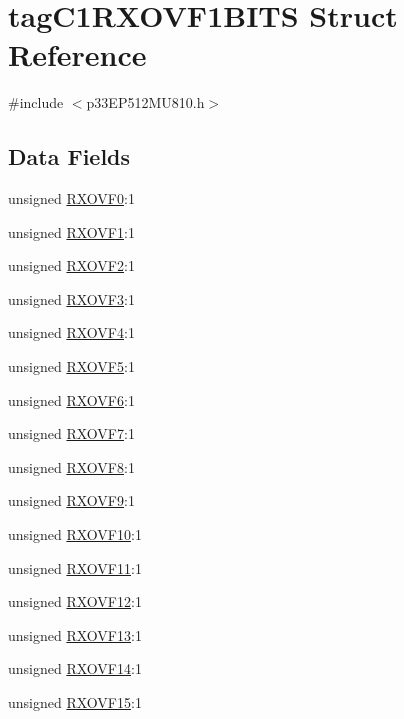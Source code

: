 \hypertarget{structtag_c1_r_x_o_v_f1_b_i_t_s}{}\section{tag\+C1\+R\+X\+O\+V\+F1\+B\+I\+TS Struct Reference}
\label{structtag_c1_r_x_o_v_f1_b_i_t_s}


{\ttfamily \#include $<$p33\+E\+P512\+M\+U810.\+h$>$}

\subsection*{Data Fields}
\begin{DoxyCompactItemize}
\item 
unsigned \hyperlink{structtag_c1_r_x_o_v_f1_b_i_t_s_ae0b847b473348ca5a45c6f38ee08bbcb}{R\+X\+O\+V\+F0}\+:1
\item 
unsigned \hyperlink{structtag_c1_r_x_o_v_f1_b_i_t_s_a891cc3298219da79ad3587b2af0ce757}{R\+X\+O\+V\+F1}\+:1
\item 
unsigned \hyperlink{structtag_c1_r_x_o_v_f1_b_i_t_s_a191326a306fedb6166b6cdc603942680}{R\+X\+O\+V\+F2}\+:1
\item 
unsigned \hyperlink{structtag_c1_r_x_o_v_f1_b_i_t_s_a1eec8dfb9c616fce24f842eb366bc147}{R\+X\+O\+V\+F3}\+:1
\item 
unsigned \hyperlink{structtag_c1_r_x_o_v_f1_b_i_t_s_a2831c78a3982628ca3784c2dca25df43}{R\+X\+O\+V\+F4}\+:1
\item 
unsigned \hyperlink{structtag_c1_r_x_o_v_f1_b_i_t_s_aed0050151e4d5c22e7028b5c12444c8a}{R\+X\+O\+V\+F5}\+:1
\item 
unsigned \hyperlink{structtag_c1_r_x_o_v_f1_b_i_t_s_a6ccb1f1e3c9cd54c2969afb6930a4ac8}{R\+X\+O\+V\+F6}\+:1
\item 
unsigned \hyperlink{structtag_c1_r_x_o_v_f1_b_i_t_s_ace6e36de91b24cb700bb1fb616d086d2}{R\+X\+O\+V\+F7}\+:1
\item 
unsigned \hyperlink{structtag_c1_r_x_o_v_f1_b_i_t_s_ab78d6bee18c7d77bd9601b3f116feea1}{R\+X\+O\+V\+F8}\+:1
\item 
unsigned \hyperlink{structtag_c1_r_x_o_v_f1_b_i_t_s_ac0b74dc5dacfef7f34c87bb86fa929c7}{R\+X\+O\+V\+F9}\+:1
\item 
unsigned \hyperlink{structtag_c1_r_x_o_v_f1_b_i_t_s_a568cb5840eae29ceca9f906f6bd741ef}{R\+X\+O\+V\+F10}\+:1
\item 
unsigned \hyperlink{structtag_c1_r_x_o_v_f1_b_i_t_s_ae3e8de9267944311f2525a9edac345b2}{R\+X\+O\+V\+F11}\+:1
\item 
unsigned \hyperlink{structtag_c1_r_x_o_v_f1_b_i_t_s_a5b6bf6e42753bf68fd9cdbdb96dc1c6f}{R\+X\+O\+V\+F12}\+:1
\item 
unsigned \hyperlink{structtag_c1_r_x_o_v_f1_b_i_t_s_a42ec9c691bf2923c7dd57bf3fbf772ad}{R\+X\+O\+V\+F13}\+:1
\item 
unsigned \hyperlink{structtag_c1_r_x_o_v_f1_b_i_t_s_a39257bd069636400b0b19f3872108ead}{R\+X\+O\+V\+F14}\+:1
\item 
unsigned \hyperlink{structtag_c1_r_x_o_v_f1_b_i_t_s_a972dd27e236e814b9892f013bdbf4f49}{R\+X\+O\+V\+F15}\+:1
\end{DoxyCompactItemize}


